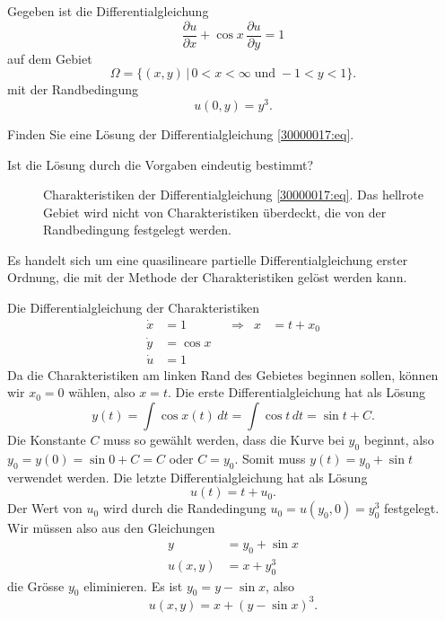 Gegeben ist die Differentialgleichung
\begin{equation}
\frac{\partial u}{\partial x}
+
\cos x\, \frac{\partial u}{\partial y}
=
1
\label{30000017:eq}
\end{equation}
auf dem Gebiet 
\[
\Omega=\{ (x,y) \,|\,
0<x<\infty
\;\text{und}\;
-1<y<1
\}.
\]
mit der Randbedingung
\[
u(0,y) = y^3.
\]
\begin{teilaufgaben}
\item
Finden Sie eine Lösung der Differentialgleichung \eqref{30000017:eq}.
\item
Ist die Lösung durch die Vorgaben eindeutig bestimmt?
\end{teilaufgaben}

\begin{loesung}
\begin{figure}
\centering
{}
\caption{Charakteristiken der Differentialgleichung
\eqref{30000017:eq}.
Das hellrote Gebiet wird nicht von Charakteristiken überdeckt, die von der
Randbedingung festgelegt werden.
\label{30000017:char}}
\end{figure}
Es handelt sich um eine quasilineare partielle Differentialgleichung erster
Ordnung, die mit der Methode der Charakteristiken gelöst werden kann.
\begin{teilaufgaben}
\item
Die Differentialgleichung der Charakteristiken
\[
\begin{aligned}
\dot x&= 1      &&\Rightarrow &x&=t+x_0\\
\dot y&= \cos x &&            & &      \\
\dot u&= 1      &&            & &
\end{aligned}
\]
Da die Charakteristiken am linken Rand des Gebietes beginnen sollen,
können wir $x_0=0$ wählen, also $x=t$. 
Die erste Differentialgleichung hat als Lösung
\[
y(t) = \int \cos x(t)\,dt = \int \cos t\,dt = \sin t + C.
\]
Die Konstante $C$ muss so gewählt werden, dass die Kurve bei $y_0$
beginnt, also $y_0=y(0)=\sin 0 + C=C$ oder $C=y_0$.
Somit muss $y(t)=y_0+\sin t$ verwendet werden.
Die letzte Differentialgleichung hat als Lösung
\[
u(t) = t + u_0.
\]
Der Wert von $u_0$ wird durch die Randedingung $u_0=u(y_0,0)=y_0^3$
festgelegt.
Wir müssen also aus den Gleichungen
\begin{align*}
y&=y_0+\sin x\\
u(x,y)&=x+y_0^3
\end{align*}
die Grösse $y_0$ eliminieren.
Es ist $y_0=y-\sin x$, also
\begin{equation}
u(x,y)
=
x + (y-\sin x)^3.
\label{30000017:l}
\end{equation}


\end{teilaufgaben}
\end{loesung}
